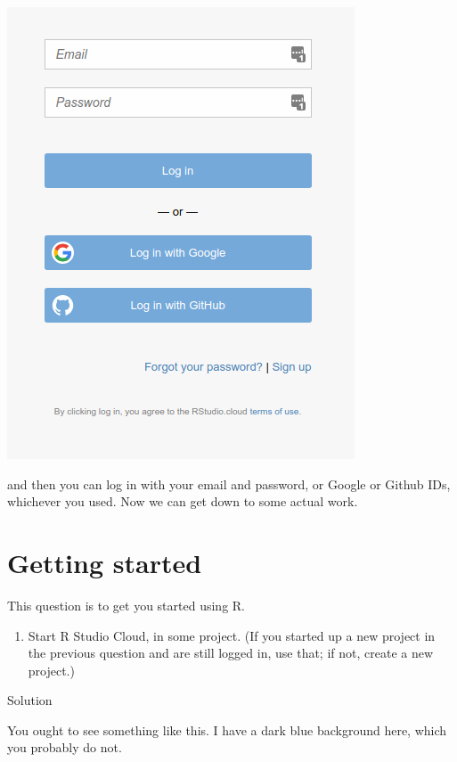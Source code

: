 \documentclass[]{tufte-book}
\providecommand{\tightlist}{%
  \setlength{\itemsep}{0pt}\setlength{\parskip}{0pt}}
\theoremstyle{definition}
\theoremstyle{definition}
\theoremstyle{definition}
\theoremstyle{remark}
\begin{document}
\includegraphics{Screenshot_2018-07-02_15-54-17.png}

and then you can log in with your email and password, or Google or
Github IDs, whichever you used. Now we can get down to some actual work.

\hypertarget{getting-started}{%
\section{Getting started}\label{getting-started}}

This question is to get you started using R.

\begin{enumerate}
\def\labelenumi{(\alph{enumi})}
\tightlist
\item
  Start R Studio Cloud, in some project. (If you started up a new
  project in the previous question and are still logged in, use that; if
  not, create a new project.)
\end{enumerate}

Solution

You ought to see something like this. I have a dark blue background
here, which you probably do not.
\end{document}
